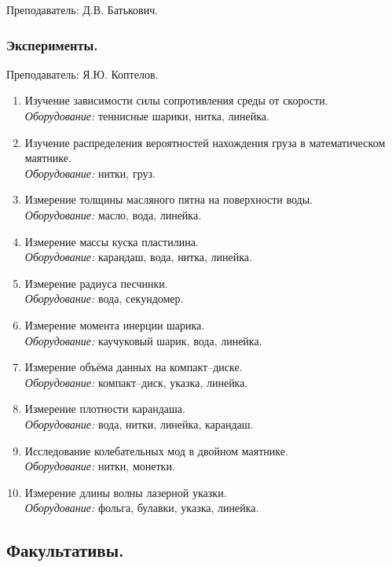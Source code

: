 \documentclass[12pt,a4paper,oneside]{scrartcl}
\begin{document}
\textsf{Преподаватель: Д.В. Батькович.}

\subsubsection{Эксперименты.}
\label{sec:daily_11_exp}

\textsf{Преподаватель: Я.Ю. Коптелов.}

\begin{enumerate}
\item Изучение зависимости силы сопротивления среды от скорости. \\
  \textit{Оборудование:} теннисные шарики, нитка, линейка.
\item Изучение распределения вероятностей нахождения груза в
  математическом маятнике. \\ \textit{Оборудование:} нитки, груз.
\item Измерение толщины масляного пятна на поверхности воды. \\
  \textit{Оборудование:} масло, вода, линейка.
\item Измерение массы куска пластилина. \\ \textit{Оборудование:}
  карандаш, вода, нитка, линейка.
\item Измерение радиуса песчинки. \\ \textit{Оборудование:} вода, секундомер.
\item Измерение момента инерции шарика. \\ \textit{Оборудование:}
  каучуковый шарик, вода, линейка.
\item Измерение объёма данных на компакт--диске. \\
  \textit{Оборудование:} компакт--диск, указка, линейка.
\item Измерение плотности карандаша. \\ \textit{Оборудование:} вода,
  нитки, линейка, карандаш.
\item Исследование колебательных мод в двойном маятнике. \\
  \textit{Оборудование:} нитки, монетки.
\item Измерение длины волны лазерной указки. \\ \textit{Оборудование:}
  фольга, булавки, указка, линейка.
\end{enumerate}

\subsection{Факультативы.}
\label{sec:elective}
\end{document}
